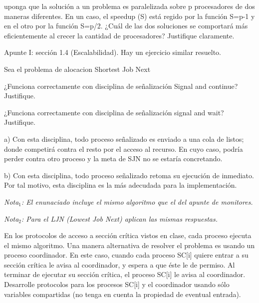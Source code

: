\documentclass[a4paper, 10pt]{article}
\newenvironment{main_question}
	{\noindent\begin{enumerate}[resume=series-name]\bfseries}
	{\end{enumerate}}
\newenvironment{sub_questions}
	{\noindent\begin{enumerate}[label=\emph{\alph*}), leftmargin=0cm]}
	{\end{enumerate}}
\newenvironment{answer}
	{\noindent\par\normalfont}
	{}
\begin{document}
\begin{main_question}
\item uponga que la solución a un problema es paralelizada sobre p procesadores de dos maneras diferentes.
En un caso, el speedup (S) está regido por la función S=p-1 y en el otro por la función S=p/2. ¿Cuál de las
dos soluciones se comportará más eficientemente al crecer la cantidad de procesadores? Justifique
claramente. 
\end{main_question}
\begin{answer}
Apunte I: sección 1.4 (Escalabilidad). Hay un ejercicio similar resuelto.
\end{answer}
\begin{main_question}
\item Sea el problema de alocacion Shortest Job Next
\begin{sub_questions}
	\item ¿Funciona correctamente con disciplina de señalización Signal and continue? Justifique.
	\item ¿Funciona correctamente con disciplina de señalización signal and wait? Justifique.
\end{sub_questions}
\end{main_question}
\begin{answer}
a) Con esta disciplina, todo proceso señalizado es enviado a una cola de listos; donde competirá contra el resto por el acceso al recurso. En cuyo caso, podría perder contra otro proceso y la meta de SJN no se estaría concretando.
	
b) Con esta disciplina, todo proceso señalizado retoma su ejecución de inmediato. Por tal motivo, esta disciplina es la más adecudada para la implementación.

\emph{Nota$_1$: El enunaciado incluye el mismo algoritmo que el del apunte de monitores.}

\emph{Nota$_2$: Para el LJN (Lowest Job Next) aplican las mismas respuestas.}
\end{answer}
\begin{main_question}
\item En los protocolos de acceso a sección crítica vistos en clase, cada proceso ejecuta el mismo algoritmo. 
Una manera alternativa de resolver el problema es usando un proceso coordinador. En este caso, cuando cada
proceso SC[i] quiere entrar a su sección crítica le avisa al coordinador, y espera a que éste le de permiso. Al
terminar de ejecutar su sección crítica, el proceso SC[i] le avisa al coordinador.
Desarrolle protocolos para los procesos SC[i] y el coordinador usando sólo variables compartidas (no
tenga en cuenta la propiedad de eventual entrada).
\end{main_question}
\end{document}
